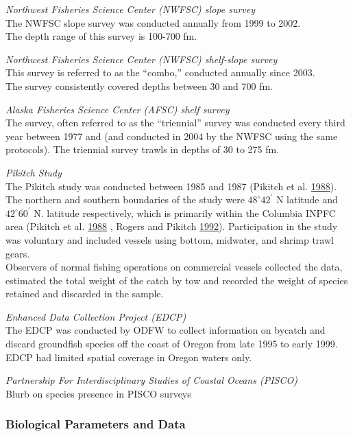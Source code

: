 \documentclass[12pt,]{article}
\begin{document}
\emph{Northwest Fisheries Science Center (NWFSC) slope survey}\\
The NWFSC slope survey was conducted annually from 1999 to 2002.\\
The depth range of this survey is 100-700 fm.

\emph{Northwest Fisheries Science Center (NWFSC) shelf-slope survey}\\
This survey is referred to as the ``combo,'' conducted annually since
2003.\\
The survey consistently covered depths between 30 and 700 fm.

\emph{Alaska Fisheries Science Center (AFSC) shelf survey}\\
The survey, often referred to as the ``triennial'' survey was conducted
every third year between 1977 and (and conducted in 2004 by the NWFSC
using the same protocols). The triennial survey trawls in depths of 30
to 275 fm.

\emph{Pikitch Study}\\
The Pikitch study was conducted between 1985 and 1987 (Pikitch et al.
\protect\hyperlink{ref-Pikitch1988}{1988}). The northern and southern
boundaries of the study were \(48^\circ 42^\prime\) N latitude and
\(42^\circ 60^\prime\) N. latitude respectively, which is primarily
within the Columbia INPFC area (Pikitch et al.
\protect\hyperlink{ref-Pikitch1988}{1988} , Rogers and Pikitch
\protect\hyperlink{ref-Rogers1992}{1992}). Participation in the study
was voluntary and included vessels using bottom, midwater, and shrimp
trawl gears.\\
Observers of normal fishing operations on commercial vessels collected
the data, estimated the total weight of the catch by tow and recorded
the weight of species retained and discarded in the sample.

\emph{Enhanced Data Collection Project (EDCP)}\\
The EDCP was conducted by ODFW to collect information on bycatch and
discard groundfish species off the coast of Oregon from late 1995 to
early 1999.\\
EDCP had limited spatial coverage in Oregon waters only.

\emph{Partnership For Interdisciplinary Studies of Coastal Oceans
(PISCO)}\\
Blurb on species presence in PISCO surveys

\subsubsection{Biological Parameters and
Data}\label{biological-parameters-and-data}
\end{document}
